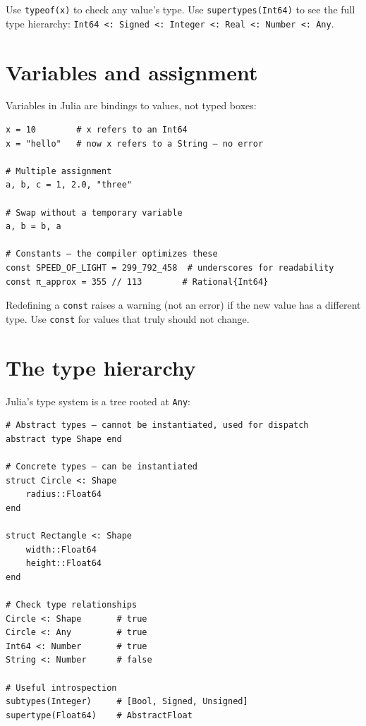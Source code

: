 \begin{juliatip}
Use \texttt{typeof(x)} to check any value's type. Use \texttt{supertypes(Int64)} to see the full type hierarchy: \texttt{Int64 <: Signed <: Integer <: Real <: Number <: Any}.
\end{juliatip}

\section{Variables and assignment}

Variables in Julia are bindings to values, not typed boxes:

\begin{verbatim}
x = 10        # x refers to an Int64
x = "hello"   # now x refers to a String — no error

# Multiple assignment
a, b, c = 1, 2.0, "three"

# Swap without a temporary variable
a, b = b, a

# Constants — the compiler optimizes these
const SPEED_OF_LIGHT = 299_792_458  # underscores for readability
const π_approx = 355 // 113        # Rational{Int64}
\end{verbatim}

\begin{warningbox}
Redefining a \texttt{const} raises a warning (not an error) if the new value has a different type. Use \texttt{const} for values that truly should not change.
\end{warningbox}

\section{The type hierarchy}

Julia's type system is a tree rooted at \texttt{Any}:

\begin{verbatim}
# Abstract types — cannot be instantiated, used for dispatch
abstract type Shape end

# Concrete types — can be instantiated
struct Circle <: Shape
    radius::Float64
end

struct Rectangle <: Shape
    width::Float64
    height::Float64
end

# Check type relationships
Circle <: Shape       # true
Circle <: Any         # true
Int64 <: Number       # true
String <: Number      # false

# Useful introspection
subtypes(Integer)     # [Bool, Signed, Unsigned]
supertype(Float64)    # AbstractFloat
\end{verbatim}

